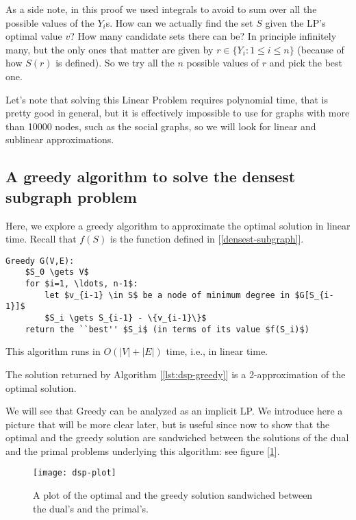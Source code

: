 As a side note, in this proof we used integrals to avoid to sum over all the possible values of the $Y_i$s. How can we actually find the set $S$ given the LP's optimal value $v$? How many candidate sets there can be? In principle infinitely many, but the only ones that matter are given by $r \in \{Y_i : 1 \leq i \leq n\}$ (because of how $S(r)$ is defined). So we try all the $n$ possible values of $r$ and pick the best one.

Let's note that solving this Linear Problem requires polynomial time, that is pretty good in general, but it is effectively impossible to use for graphs with more than 10000 nodes, such as the social graphs, so we will look for linear and sublinear approximations.


\subsection{A greedy algorithm to solve the densest subgraph problem}

Here, we explore a greedy algorithm to approximate the optimal solution in linear time. Recall that $f(S)$ is the function defined in [\ref{densest-subgraph}].

\begin{lstlisting}[caption={The Greedy algorithm to solve the densest subgraph problem},label={lst:dsp-greedy}]
Greedy G(V,E):
    $S_0 \gets V$
    for $i=1, \ldots, n-1$:
        let $v_{i-1} \in S$ be a node of minimum degree in $G[S_{i-1}]$
        $S_i \gets S_{i-1} - \{v_{i-1}\}$
    return the ``best'' $S_i$ (in terms of its value $f(S_i)$)
\end{lstlisting}

\begin{obs}
    This algorithm runs in $O(|V| + |E|)$ time, i.e., in linear time.
\end{obs}

\begin{thm}\label{thm:dsp-greedy}
    The solution returned by Algorithm [\ref{lst:dsp-greedy}] is a 2-approximation of the optimal solution.
\end{thm}

\begin{obs}
    We will see that Greedy can be analyzed as an implicit LP. We introduce here a picture that will be more clear later, but is useful since now to show that the optimal and the greedy solution are sandwiched between the solutions of the dual and the primal problems underlying this algorithm: see figure [\ref{fig:dsp-plot}].
    \begin{figure}[h!]
        \centering
        \texttt{[image: dsp-plot]}
        \caption{A plot of the optimal and the greedy solution sandwiched between the dual's and the primal's.}
        \label{fig:dsp-plot}
    \end{figure}
\end{obs}

